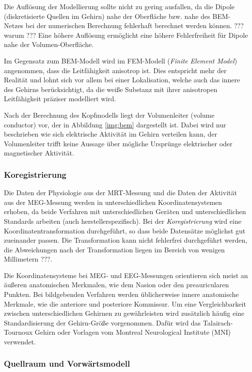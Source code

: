 \documentclass[doc,a4paper,12pt]{apa6}
\begin{document}
Die Auflösung der Modellierung sollte nicht zu gering ausfallen, da die Dipole (diskretisierte Quellen im Gehirn) nahe der Oberfläche bzw. nahe des BEM-Netzes bei der numerischen Berechnung fehlerhaft berechnet werden können.
??? warum ???
Eine höhere Auflösung ermöglicht eine höhere Fehlerfreiheit für Dipole nahe der Volumen-Oberfläche.

Im Gegensatz zum BEM-Modell wird im FEM-Modell (\emph{Finite Element Model}) angenommen, dass die Leitfähigkeit anisotrop ist. Dies entspricht mehr der Realität und lohnt sich vor allem bei einer Lokalisation, welche auch das innere des Gehirns berücksichtigt, da die weiße Substanz mit ihrer anisotropen Leitfähigkeit präziser modelliert wird.

Nach der Berechnung des Kopfmodells liegt der Volumenleiter (volume conductor) vor, der in Abbildung \ref{img:bem} dargestellt ist. Dabei wird nur beschrieben wie sich elektrische Aktivität im Gehirn verteilen kann, der Volumenleiter trifft keine Aussage über mögliche Ursprünge elektrischer oder magnetischer Aktivität.

\subsubsection{Koregistrierung}

Die Daten der Physiologie aus der MRT-Messung und die Daten der Aktivität aus der MEG-Messung werden in unterschiedlichen Koordinatensystemen erhoben, da beide Verfahren mit unterschiedlichen Geräten und unterschiedlichen Standards arbeiten (auch herstellerspezifisch). Bei der \emph{Koregistrierung} wird eine Koordinatentransformation durchgeführt, so dass beide Datensätze möglichst gut zueinander passen. Die Transformation kann nicht fehlerfrei durchgeführt werden, die Abweichungen nach der Transformation liegen im Bereich von wenigen Millimetern ???.

Die Koordinatensysteme bei MEG- und EEG-Messungen orientieren sich meist an äußeren anatomischen Merkmalen, wie dem Nasion oder den preauricularen Punkten. Bei bildgebenden Verfahren werden üblicherweise innere anatomische Merkmale, wie die anteriore und posteriore Kommissur. Um eine Vergleichbarkeit zwischen unterschiedlichen Gehirnen zu gewährleisten wird zusätzlich häufig eine Standardisierung der Gehirn-Größe vorgenommen. Dafür wird das Talairach-Tournoux Gehirn oder Vorlagen vom Montreal Neurological Institute (MNI) verwendet.

\subsubsection{Quellraum und Vorwärtsmodell}
\end{document}
